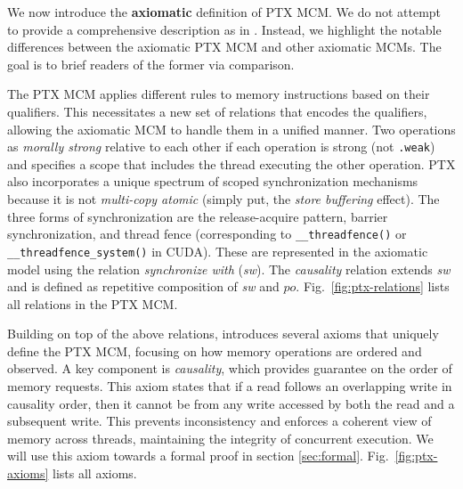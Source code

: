 \documentclass[acmsmall]{acmart}
\begin{document}
We now introduce the \textbf{axiomatic} definition of PTX MCM. We do not attempt to provide a comprehensive description as in \cite{ptx-mcm}. Instead, we highlight the notable differences between the axiomatic PTX MCM and other axiomatic MCMs. The goal is to brief readers of the former via comparison.

The PTX MCM applies different rules to memory instructions based on their qualifiers. This necessitates a new set of relations that encodes the qualifiers, allowing the axiomatic MCM to handle them in a unified manner.
Two operations as \textit{morally strong} relative to each other if each operation is strong (not \verb|.weak|) and specifies a scope that includes the thread executing the other operation.
PTX also incorporates a unique spectrum of scoped synchronization mechanisms because it is not \textit{multi-copy atomic} (simply put, the \textit{store buffering} effect). The three forms of synchronization are the release-acquire pattern, barrier synchronization, and thread fence (corresponding to \verb|__threadfence()| or \verb|__threadfence_system()| in CUDA). These are represented in the axiomatic model using the relation \textit{synchronize with} (\textit{sw}). The \textit{causality} relation extends \textit{sw} and is defined as repetitive composition of \textit{sw} and $po$. Fig.~\ref{fig:ptx-relations} lists all relations in the PTX MCM.

Building on top of the above relations, \cite{ptx-mcm} introduces several axioms that uniquely define the PTX MCM, focusing on how memory operations are ordered and observed. A key component is \textit{causality}, which provides guarantee on the order of memory requests. This axiom states that if a read follows an overlapping write in causality order, then it cannot be from any write accessed by both the read and a subsequent write. This prevents inconsistency and enforces a coherent view of memory across threads, maintaining the integrity of concurrent execution. We will use this axiom towards a formal proof in section \ref{sec:formal}. Fig.~\ref{fig:ptx-axioms} lists all axioms.
\end{document}
